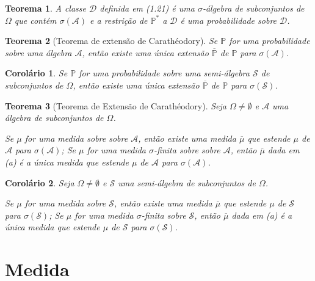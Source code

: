\documentclass[12pt,a4paper,answers]{article}
\numberwithin{equation}{section} %
\renewcommand{\P}{\mathbb{P}}
\newcommand{\Acal}{\mathcal{A}}
\newcommand{\Dcal}{\mathcal{D}}
\newcommand{\Scal}{\mathcal{S}}
\theoremstyle{thm_estilo}
\newtheorem{theorem}{Teorema}[section]
\newtheorem{corollary}{Corolário}[section]
\theoremstyle{thm_note_est}
\begin{document}
\begin{theorem}
	A classe $\Dcal$ definida em (1.21) é uma $\sigma$-álgebra de subconjuntos de $\Omega$ que contém $\sigma(\Acal)$ e a restrição de $\P^*$ a $\Dcal$ é uma probabilidade sobre $\Dcal$.
\end{theorem}

\begin{theorem}[Teorema de extensão de Carathéodory]
	Se $\P$ for uma probabilidade sobre uma álgebra $\Acal$, então existe uma única extensão $\overline{\P}$ de $\P$ para $\sigma(\Acal)$.
\end{theorem}

\begin{corollary}
	Se $\P$ for uma probabilidade sobre uma semi-álgebra $\Scal$ de subconjuntos de $\Omega$, então existe uma única extensão $\overline{\P}$ de $\P$ para $\sigma(\Scal)$.
\end{corollary}

\begin{theorem}[Teorema de Extensão de Carathéodory]
	Seja $\Omega \neq \emptyset$ e $\Acal$ uma álgebra de subconjuntos de $\Omega$.
	\begin{outline}[enumerate]
		\1 Se $\mu$ for uma medida sobre sobre $\Acal$, então existe uma medida $\overline{\mu}$ que estende $\mu$ de $\Acal$ para $\sigma(\Acal)$;
		\1 Se $\mu$ for uma medida $\sigma$-finita sobre sobre $\Acal$, então $\overline{\mu}$ dada em (a) é a única medida que estende $\mu$ de $\Acal$ para $\sigma(\Acal)$.
	\end{outline}
\end{theorem}

\begin{corollary}
	Seja $\Omega \neq \emptyset$ e $\Scal$ uma semi-álgebra de subconjuntos de $\Omega$.
	\begin{outline}[enumerate]
		\1 Se $\mu$ for uma medida sobre $\Scal$, então existe uma medida $\overline{\mu}$ que estende $\mu$ de $\Scal$ para $\sigma(\Scal)$;
		\1 Se $\mu$ for uma medida $\sigma$-finita sobre $\Scal$, então $\overline{\mu}$ dada em (a) é a única medida que estende $\mu$ de $\Scal$ para $\sigma(\Scal)$.
	\end{outline}
\end{corollary}



\section{Medida}
\end{document}
